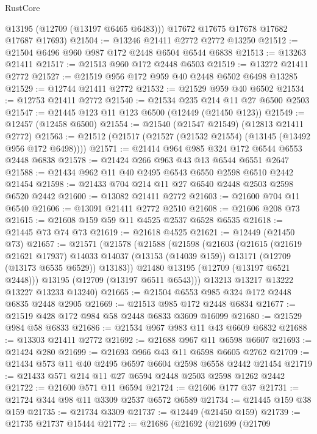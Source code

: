 \begin{lexlean}{RustCore}
\begin{coremodule}
        @13195
        (@12709 (@13197 @6465 @6483)))
      @17672
      @17675
      @17678
      @17682
      @17687
      @17693)
@21504 := @13246 @21411 @2772 @2772 @13250
@21512 := @21504 @6496 @960 @987 @172 @2448 @6504 @6544 @6838
@21513 := @13263 @21411
@21517 := @21513 @960 @172 @2448 @6503
@21519 := @13272 @21411 @2772
@21527 := @21519 @956 @172 @959 @40 @2448 @6502 @6498 @13285
@21529 := @12744 @21411 @2772
@21532 := @21529 @959 @40 @6502
@21534 := @12753 @21411 @2772
@21540 := @21534 @235 @214 @11 @27 @6500 @2503
@21547 := @21445 @123 @11 @123 @6500 (@12449 (@21450 @123))
@21549 := @12457 (@12458 @6500)
@21554 := @21540 (@21547 @21549) (@12813 @21411 @2772)
@21563 := @21512 (@21517 (@21527 (@21532 @21554) (@13145 (@13492 @956 @172 @6498))))
@21571 := @21414 @964 @985 @324 @172 @6544 @6553 @2448 @6838
@21578 := @21424 @266 @963 @43 @13 @6544 @6551 @2647
@21588 := @21434 @962 @11 @40 @2495 @6543 @6550 @2598 @6510 @2442 @21454
@21598 := @21433 @704 @214 @11 @27 @6540 @2448 @2503 @2598 @6520 @2442
@21600 := @13082 @21411 @2772
@21603 := @21600 @704 @11 @6540
@21606 := @13091 @21411 @2772 @2510
@21608 := @21606 @208 @73
@21615 := @21608 @159 @59 @11 @4525 @2537 @6528 @6535
@21618 := @21445 @73 @74 @73
@21619 := @21618 @4525
@21621 := @12449 (@21450 @73)
@21657 := @21571
    (@21578
      (@21588
        (@21598
          (@21603
            (@21615
              (@21619 @21621 @17937)
              @14033
              @14037
              (@13153 (@14039 @159))
              @13171
              (@12709 (@13173 @6535 @6529))
              @13183))
          @21480
          @13195
          (@12709 (@13197 @6521 @2448)))
        @13195
        (@12709 (@13197 @6511 @6543)))
      @13213
      @13217
      @13222
      @13227
      @13233
      @13240)
@21665 := @21504 @6553 @985 @324 @172 @2448 @6835 @2448 @2905
@21669 := @21513 @985 @172 @2448 @6834
@21677 := @21519 @428 @172 @984 @58 @2448 @6833 @3609 @16099
@21680 := @21529 @984 @58 @6833
@21686 := @21534 @967 @983 @11 @43 @6609 @6832
@21688 := @13303 @21411 @2772
@21692 := @21688 @967 @11 @6598 @6607
@21693 := @21424 @280
@21699 := @21693 @966 @43 @11 @6598 @6605 @2762
@21709 := @21434 @573 @11 @40 @2495 @6597 @6604 @2598 @6558 @2442 @21454
@21719 := @21433 @571 @214 @11 @27 @6594 @2448 @2503 @2598 @1262 @2442
@21722 := @21600 @571 @11 @6594
@21724 := @21606 @177 @37
@21731 := @21724 @344 @98 @11 @3309 @2537 @6572 @6589
@21734 := @21445 @159 @38 @159
@21735 := @21734 @3309
@21737 := @12449 (@21450 @159)
@21739 := @21735 @21737 @15444
@21772 := @21686
    (@21692
      (@21699
        (@21709

\end{coremodule}
\end{lexlean}
